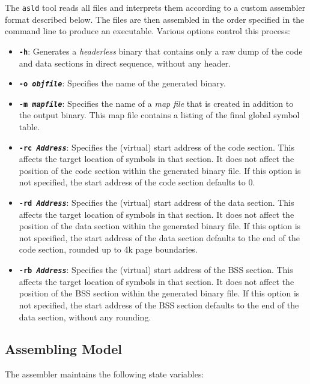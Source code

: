 The {\tt asld} tool reads all files and interprets them according to a custom assembler format described below. The files are then assembled in the order specified in the command line to produce an executable. Various options control this process:
\begin{itemize}
\item {\tt \bf -h}: Generates a {\it headerless} binary that contains only a raw dump of the code and data sections in direct sequence, without any header.
\item {\tt \bf -o \it objfile}: Specifies the name of the generated binary.
\item {\tt \bf -m \it mapfile}: Specifies the name of a {\it map file} that is created in addition to the output binary. This map file contains a listing of the final global symbol table.
\item {\tt \bf -rc \it Address}: Specifies the (virtual) start address of the code section. This affects the target location of symbols in that section. It does not affect the position of the code section within the generated binary file. If this option is not specified, the start address of the code section defaults to 0.
\item {\tt \bf -rd \it Address}: Specifies the (virtual) start address of the data section. This affects the target location of symbols in that section. It does not affect the position of the data section within the generated binary file. If this option is not specified, the start address of the data section defaults to the end of the code section, rounded up to 4k page boundaries.
\item {\tt \bf -rb \it Address}: Specifies the (virtual) start address of the BSS section. This affects the target location of symbols in that section. It does not affect the position of the BSS section within the generated binary file. If this option is not specified, the start address of the BSS section defaults to the end of the data section, without any rounding.
\end{itemize}

\subsection{Assembling Model}

The assembler maintains the following state variables:


